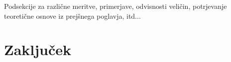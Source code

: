 \documentclass[a4paper,twoside,openright,12pt,slovene]{book}
\begin{document}
Podsekcije za različne meritve, primerjave, odvisnosti veličin, potrjevanje teoretične osnove iz prejšnega poglavja, itd...

\chapter{Zaključek} \label{zakljucek}


\cleardoublepage{} %





\appendix
\end{document}
